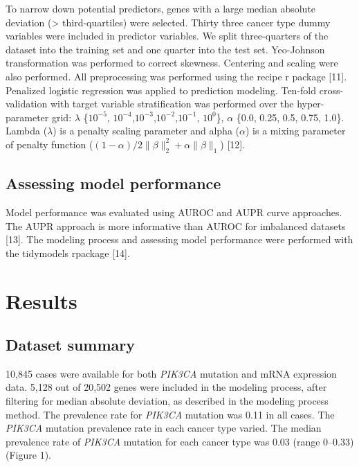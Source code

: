 \documentclass[10pt,letterpaper]{article}
\begin{document}
To narrow down potential predictors, genes with a large median absolute
deviation (\textgreater{} third-quartiles) were selected. Thirty three
cancer type dummy variables were included in predictor variables. We
split three-quarters of the dataset into the training set and one
quarter into the test set. Yeo-Johnson transformation was performed to
correct skewness. Centering and scaling were also performed. All
preprocessing was performed using the recipe r package {[}11{]}.
Penalized logistic regression was applied to prediction modeling.
Ten-fold cross-validation with target variable stratification was
performed over the hyper-parameter grid: \(\lambda\) \{\(10^{-5}\),
\(10^{-4}\),\(10^{-3}\),\(10^{-2}\),\(10^{-1}\), \(10^{0}\)\},
\(\alpha\) \{0.0, 0.25, 0.5, 0.75, 1.0\}. Lambda (\(\lambda\)) is a
penalty scaling parameter and alpha (\(\alpha\)) is a mixing parameter
of penalty function
(\((1-\alpha)/2 \lVert\beta\rVert_2^2+\alpha\lVert \beta \rVert_1\))
{[}12{]}.

\hypertarget{assessing-model-performance}{%
\subsection{Assessing model
performance}\label{assessing-model-performance}}

Model performance was evaluated using AUROC and AUPR curve approaches.
The AUPR approach is more informative than AUROC for imbalanced datasets
{[}13{]}. The modeling process and assessing model performance were
performed with the tidymodels rpackage {[}14{]}.

\hypertarget{results}{%
\section{Results}\label{results}}

\hypertarget{dataset-summary}{%
\subsection{Dataset summary}\label{dataset-summary}}

10,845 cases were available for both \emph{PIK3CA} mutation and mRNA
expression data. 5,128 out of 20,502 genes were included in the modeling
process, after filtering for median absolute deviation, as described in
the modeling process method. The prevalence rate for \emph{PIK3CA}
mutation was 0.11 in all cases. The \emph{PIK3CA} mutation prevalence
rate in each cancer type varied. The median prevalence rate of
\emph{PIK3CA} mutation for each cancer type was 0.03 (range 0--0.33)
(Figure 1).
\end{document}
